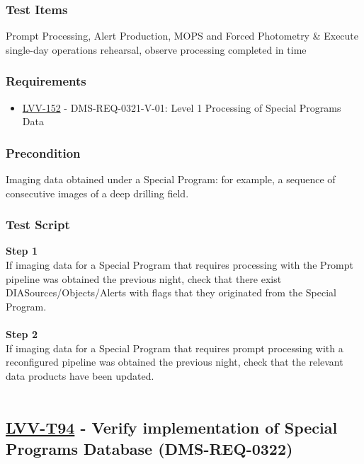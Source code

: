 \hypertarget{test-items-69}{%
\subsubsection{Test Items}\label{test-items-69}}

Prompt Processing, Alert Production, MOPS and Forced Photometry \&
Execute single-day operations rehearsal, observe processing completed in
time

\hypertarget{requirements-70}{%
\subsubsection{Requirements}\label{requirements-70}}

\begin{itemize}
\tightlist
\item
  \href{https://jira.lsstcorp.org/browse/LVV-152}{LVV-152} -
  DMS-REQ-0321-V-01: Level 1 Processing of Special Programs Data
\end{itemize}

\hypertarget{precondition-12}{%
\subsubsection{Precondition}\label{precondition-12}}

Imaging data obtained under a Special Program: for example, a sequence
of consecutive images of a deep drilling field.

\hypertarget{test-script-70}{%
\subsubsection{Test Script}\label{test-script-70}}

\textbf{Step 1}\\
If imaging data for a Special Program that requires processing with the
Prompt pipeline was obtained the previous night, check that there exist
DIASources/Objects/Alerts with flags that they originated from the
Special Program.\\
~\\
\textbf{Step 2}\\
If imaging data for a Special Program that requires prompt processing
with a reconfigured pipeline was obtained the previous night, check that
the relevant data products have been updated.\\
~\\

\hypertarget{lvv-t94---verify-implementation-of-special-programs-database-dms-req-0322}{%
\subsection{\texorpdfstring{\href{https://jira.lsstcorp.org/secure/Tests.jspa\#/testCase/LVV-T94}{LVV-T94}
- Verify implementation of Special Programs Database
(DMS-REQ-0322)}{LVV-T94 - Verify implementation of Special Programs Database (DMS-REQ-0322)}}\label{lvv-t94---verify-implementation-of-special-programs-database-dms-req-0322}}


